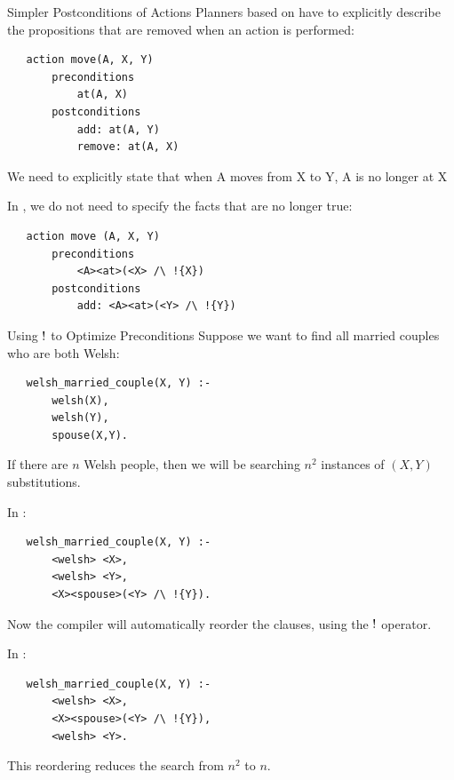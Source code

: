 \begin{frame}[fragile]{Simpler Postconditions of Actions}
Planners based on \fol{} have to explicitly describe the propositions that
are removed when an action is performed:
\begin{verbatim}
   action move(A, X, Y)
       preconditions
           at(A, X)
       postconditions
           add: at(A, Y) 
           remove: at(A, X)
\end{verbatim}
We need to explicitly state that when A moves from X to Y, A is no longer at X
\end{frame}

\begin{frame}[fragile]
In \cathoristic{}, we do not need to specify the facts that are no longer true:
\begin{verbatim}
   action move (A, X, Y)
       preconditions
           <A><at>(<X> /\ !{X})
       postconditions
           add: <A><at>(<Y> /\ !{Y})
\end{verbatim}
\end{frame}

\begin{frame}[fragile]{Using $!$ to Optimize Preconditions}
Suppose we want to find all married couples who are both Welsh:
\begin{verbatim}
   welsh_married_couple(X, Y) :-
       welsh(X),
       welsh(Y),
       spouse(X,Y).
\end{verbatim}	
If there are $n$ Welsh people, then we will be searching $n^2$ instances of $(X,Y)$ substitutions.
\end{frame}

\begin{frame}[fragile]
In \cathoristic{}:
\begin{verbatim}
   welsh_married_couple(X, Y) :-
       <welsh> <X>,
       <welsh> <Y>,
       <X><spouse>(<Y> /\ !{Y}).
\end{verbatim}	
Now the compiler will automatically reorder the clauses, using the $!$ operator.
\end{frame}

\begin{frame}[fragile]
In \cathoristic{}:
\begin{verbatim}
   welsh_married_couple(X, Y) :-
       <welsh> <X>,
       <X><spouse>(<Y> /\ !{Y}),
       <welsh> <Y>.
\end{verbatim}	
This reordering reduces the search from $n^2$ to $n$.
\end{frame}

